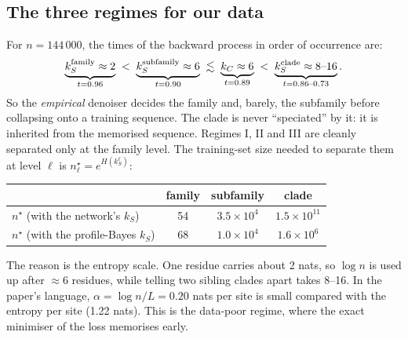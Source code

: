 \subsection{The three regimes for our data}
For $n=144\,000$, the times of the backward process in order of occurrence are:
\[
\underbrace{k_S^{\rm family}\approx2}_{t=0.96}\;<\;\underbrace{k_S^{\rm subfamily}\approx6}_{t=0.90}\;\lesssim\;
\underbrace{k_C\approx6}_{t=0.89}\;<\;\underbrace{k_S^{\rm clade}\approx8\text{--}16}_{t=0.86\text{--}0.73}.
\]
So the \emph{empirical} denoiser decides the family and, barely, the subfamily before collapsing onto a training
sequence. The clade is never ``speciated'' by it: it is inherited from the memorised sequence. Regimes I, II and III
are cleanly separated only at the family level. The training-set size needed to separate them at level $\ell$ is
$n^\star_\ell=e^{H(k_S^\ell)}$:
\begin{center}\footnotesize
\begin{tabular}{lccc}
\toprule
 & family & subfamily & clade\\
\midrule
$n^\star$ (with the network's $k_S$) & 54 & $3.5\times10^4$ & $1.5\times10^{11}$\\
$n^\star$ (with the profile-Bayes $k_S$) & 68 & $1.0\times10^4$ & $1.6\times10^6$\\
\bottomrule
\end{tabular}
\end{center}
The reason is the entropy scale. One residue carries about 2 nats, so $\log n$ is used up after $\approx6$ residues,
while telling two sibling clades apart takes 8--16. In the paper's language, $\alpha=\log n/L=0.20$ nats per site
is small compared with the entropy per site (1.22 nats). This is the data-poor regime, where the exact minimiser of the
loss memorises early.

